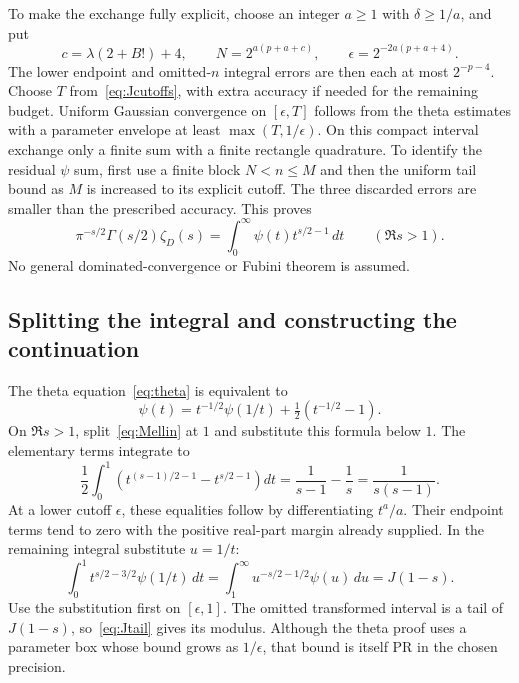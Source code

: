 \documentclass[11pt,letterpaper]{article}
\numberwithin{equation}{section}
\theoremstyle{definition}
\newcommand{\ps}{\psi}
\newcommand{\lceilog}{\lambda}
\begin{document}
To make the exchange fully explicit, choose an integer \(a\ge1\)
with \(\delta\ge1/a\), and put
\[
 c=\lceilog(2+B!)+4,\qquad
 N=2^{a(p+a+c)},\qquad
 \epsilon=2^{-2a(p+a+4)}.
\]
The lower endpoint and omitted-\(n\) integral errors are then each
at most \(2^{-p-4}\). Choose \(T\) from~\eqref{eq:Jcutoffs},
with extra accuracy if needed for the remaining budget.
Uniform Gaussian convergence on \([\epsilon,T]\) follows from
the theta estimates with a parameter envelope at least
\(\max(T,1/\epsilon)\).
On this compact interval exchange only a finite sum with a finite
rectangle quadrature. To identify the residual \(\ps\) sum,
first use a finite block \(N<n\le M\) and then the uniform tail
bound as \(M\) is increased to its explicit cutoff.
The three discarded errors are smaller than the prescribed
accuracy. This proves
\begin{equation}
 \boxed{\pi^{-s/2}\Gamma(s/2)\zeta_D(s)
        =\int_0^\infty\ps(t)t^{s/2-1}\,dt
          \qquad(\Re s>1).}                              \label{eq:Mellin}
\end{equation}
No general dominated-convergence or Fubini theorem is assumed.

\subsection{Splitting the integral and constructing the continuation}

The theta equation~\eqref{eq:theta} is equivalent to
\begin{equation}
 \ps(t)=t^{-1/2}\ps(1/t)+\tfrac12(t^{-1/2}-1).
 \label{eq:psitransform}
\end{equation}
On \(\Re s>1\), split~\eqref{eq:Mellin} at \(1\) and substitute
this formula below \(1\). The elementary terms integrate to
\begin{equation}
 \frac12\int_0^1
        \left(t^{(s-1)/2-1}-t^{s/2-1}\right)dt
              =\frac1{s-1}-\frac1s=\frac1{s(s-1)}.
 \label{eq:elementaryMellin}
\end{equation}
At a lower cutoff \(\epsilon\), these equalities follow by
differentiating \(t^a/a\). Their endpoint terms tend to zero with
the positive real-part margin already supplied.
In the remaining integral substitute \(u=1/t\):
\begin{equation}
 \int_0^1 t^{s/2-3/2}\ps(1/t)\,dt
       =\int_1^\infty u^{-s/2-1/2}\ps(u)\,du=J(1-s).
 \label{eq:inverseMellin}
\end{equation}
Use the substitution first on \([\epsilon,1]\).
The omitted transformed interval is a tail of \(J(1-s)\),
so~\eqref{eq:Jtail} gives its modulus.
Although the theta proof uses a parameter box whose bound grows
as \(1/\epsilon\), that bound is itself PR in the chosen precision.
\end{document}
